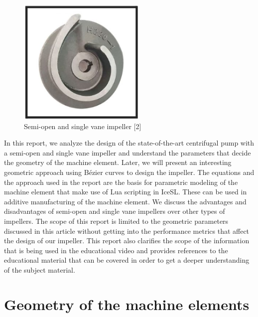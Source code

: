 \documentclass[11pt,a4paper]{scrartcl}
\begin{document}
\begin{figure}[h]
    \centering
    \includegraphics[scale=0.8]{image3.png}
    \caption{Semi-open and single vane impeller [2]}
   
    \label{fig:image3}
   
\end{figure}
In this report, we analyze the design of the state-of-the-art centrifugal pump with a semi-open and single vane impeller and understand the parameters that decide the geometry of the machine element. Later, we will present an interesting geometric approach using Bézier curves to design the impeller. The equations and the approach used in the report are the basis for parametric modeling of the machine element that make use of Lua scripting in IceSL. These can be used in additive manufacturing of the machine element. We discuss the advantages and disadvantages of semi-open and single vane impellers over other types of impellers. The scope of this report is limited to the geometric parameters discussed in this article without getting into the performance metrics that affect the design of our impeller. This report also clarifies the scope of the information that is being used in the educational video and provides references to the educational material that can be covered in order to get a deeper understanding of the subject material.

\section{Geometry of the machine elements}
\end{document}
